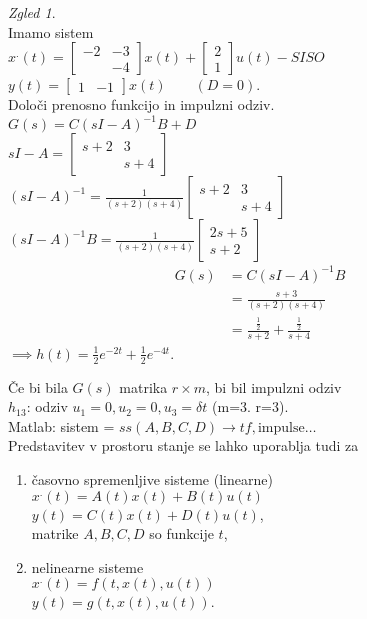 \documentclass[a4paper, 12pt]{book}
\theoremstyle{definition}
\theoremstyle{remark}
\newtheorem*{exmp}{Zgled}
\begin{document}
\begin{exmp} \text{} \\
    Imamo sistem \\
    $x^{.}(t) = \begin{bmatrix} -2 & -3 \\ & -4 \end{bmatrix} x(t) + \begin{bmatrix} 2 \\ 1 \end{bmatrix} u(t) - SISO$ \\
    $y(t) = \begin{bmatrix} 1 & -1 \end{bmatrix} x(t) \qquad (D = 0)$. \\
    Določi prenosno funkcijo in impulzni odziv. \\
    $G(s) = C (sI - A)^{-1} B + D$ \\
    $sI - A = \begin{bmatrix} s+2 & 3 \\ & s+4 \end{bmatrix}$ \\
    $(sI - A)^{-1} = \frac{1}{(s+2)(s+4)} \begin{bmatrix} s+2 & 3 \\ & s+4 \end{bmatrix}$ \\
    $(sI - A)^{-1}B = \frac{1}{(s+2)(s+4)} \begin{bmatrix} 2s+5 \\ s+2 \end{bmatrix}$
    \begin{align*}
        G(s) &= C (sI - A)^{-1} B \\
        &= \frac{s+3}{(s+2)(s+4)} \\
        &= \frac{\frac{1}{2}}{s+2} + \frac{\frac{1}{2}}{s+4}
    \end{align*}
    $\implies h(t) = \frac{1}{2} e^{-2t} + \frac{1}{2} e^{-4t}$.
\end{exmp}
Če bi bila $G(s)$ matrika $r \times m$, bi bil impulzni odziv \\
$h_{13}$: odziv $u_1 = 0, u_2 = 0, u_3 = \delta{t}$ (m=3. r=3). \\
Matlab: sistem = $ss(A, B, C, D) \to tf, \text{impulse} \dots$ \\
Predstavitev v prostoru stanje se lahko uporablja tudi za
\begin{enumerate}[label=\alph*)]
    \item časovno spremenljive sisteme (linearne) \\
        $x^{.}(t) = A(t) x(t) + B(t) u(t)$ \\
        $y(t) = C(t) x(t) + D(t) u(t)$, \\
        matrike $A, B, C, D$ so funkcije $t$,
    \item nelinearne sisteme \\
        $x^{.}(t) = f(t, x(t), u(t))$ \\
        $y(t) = g(t, x(t), u(t))$.
\end{enumerate}
\end{document}
